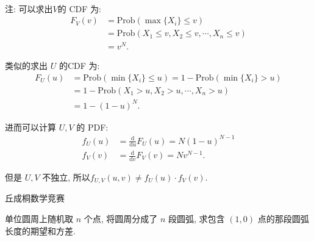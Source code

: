 ~

注: 可以求出$V$的 CDF 为:
\begin{align*}
F_V(v) &= \mathrm{Prob}(\max\{X_i\} \le v)\\
&= \mathrm{Prob}(X_1\le v, X_2\le v, \cdots, X_n\le v) \\
&= v^N .
\end{align*}

类似的求出 $U$ 的CDF 为:
\begin{align*}
F_U(u) &= \mathrm{Prob}(\min\{X_i\} \le u) = 1- \mathrm{Prob}(\min\{X_i\} > u)\\
 &= 1 - \mathrm{Prob}(X_1 > u, X_2 > u, \cdots, X_n > u)\\ 
 &= 1 - (1-u)^N.
\end{align*}

进而可以计算 $U,V$ 的 PDF:
\begin{align*}
f_U(u) &= \frac{\mathrm{d}}{\mathrm{d}u}F_U(u) = N(1-u)^{N-1} \\
f_V(v) &= \frac{\mathrm{d}}{\mathrm{d}v}F_V(v) = Nv^{N-1} .
\end{align*}

但是 $U,V$ 不独立, 所以$f_{U,V}(u,v) \neq f_U(u)\cdot f_V(v)$.


\newpage

 丘成桐数学竞赛

单位圆周上随机取 $n$ 个点, 将圆周分成了 $n$ 段圆弧, 求包含 $(1,0)$ 点的那段圆弧长度的期望和方差.

~

